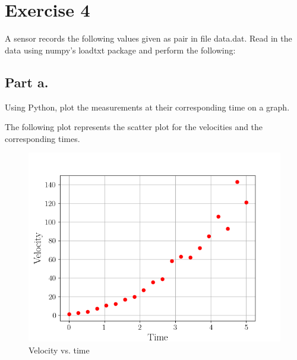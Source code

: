 \section{Exercise 4}
A sensor records the following values given as pair  in file data.dat.
Read in the data using numpy's loadtxt package and perform the following:

\subsection{Part a.}
Using Python, plot the measurements at their corresponding time on a
graph.
\begin{mdframed}[style=MyFrame]
    The following plot represents the scatter plot for the velocities
    and the corresponding times.
    \begin{figure}[H]
        \includegraphics[height=0.35\textheight]{media/scatter.png}
        \caption{Velocity vs. time}
    \end{figure}
\end{mdframed}

